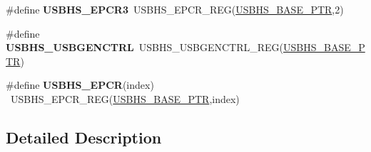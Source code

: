 \begin{DoxyCompactItemize}
\item 
\hypertarget{group___u_s_b_h_s___register___accessor___macros_gaf40705baf11489043c914c1a47634008}{}\#define {\bfseries U\+S\+B\+H\+S\+\_\+\+E\+P\+C\+R3}~U\+S\+B\+H\+S\+\_\+\+E\+P\+C\+R\+\_\+\+R\+E\+G(\hyperlink{group___u_s_b_h_s___peripheral_gaa2bc10b8cd66f96acd39e15b3a581306}{U\+S\+B\+H\+S\+\_\+\+B\+A\+S\+E\+\_\+\+P\+T\+R},2)\label{group___u_s_b_h_s___register___accessor___macros_gaf40705baf11489043c914c1a47634008}

\item 
\hypertarget{group___u_s_b_h_s___register___accessor___macros_ga9af58e813ed1a9811acc10b7275d9aae}{}\#define {\bfseries U\+S\+B\+H\+S\+\_\+\+U\+S\+B\+G\+E\+N\+C\+T\+R\+L}~U\+S\+B\+H\+S\+\_\+\+U\+S\+B\+G\+E\+N\+C\+T\+R\+L\+\_\+\+R\+E\+G(\hyperlink{group___u_s_b_h_s___peripheral_gaa2bc10b8cd66f96acd39e15b3a581306}{U\+S\+B\+H\+S\+\_\+\+B\+A\+S\+E\+\_\+\+P\+T\+R})\label{group___u_s_b_h_s___register___accessor___macros_ga9af58e813ed1a9811acc10b7275d9aae}

\item 
\hypertarget{group___u_s_b_h_s___register___accessor___macros_ga88053e3e3eeb212a54c51c5b6e362b95}{}\#define {\bfseries U\+S\+B\+H\+S\+\_\+\+E\+P\+C\+R}(index)                                            ~U\+S\+B\+H\+S\+\_\+\+E\+P\+C\+R\+\_\+\+R\+E\+G(\hyperlink{group___u_s_b_h_s___peripheral_gaa2bc10b8cd66f96acd39e15b3a581306}{U\+S\+B\+H\+S\+\_\+\+B\+A\+S\+E\+\_\+\+P\+T\+R},index)\label{group___u_s_b_h_s___register___accessor___macros_ga88053e3e3eeb212a54c51c5b6e362b95}

\end{DoxyCompactItemize}


\subsection{Detailed Description}
